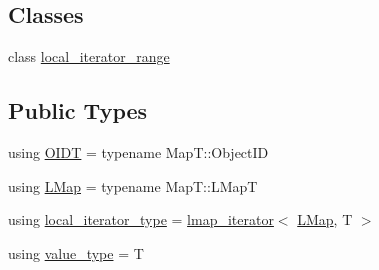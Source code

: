 \subsection*{Classes}
\begin{DoxyCompactItemize}
\item 
class \hyperlink{classshad_1_1map__iterator_1_1local__iterator__range}{local\-\_\-iterator\-\_\-range}
\end{DoxyCompactItemize}
\subsection*{Public Types}
\begin{DoxyCompactItemize}
\item 
using \hyperlink{classshad_1_1map__iterator_aecdaced930b9dcb48d5eff9ef992fbd5}{O\-I\-D\-T} = typename Map\-T\-::\-Object\-I\-D
\item 
using \hyperlink{classshad_1_1map__iterator_a157d8b69a2befd7e61c0df9eb52b2a71}{L\-Map} = typename Map\-T\-::\-L\-Map\-T
\item 
using \hyperlink{classshad_1_1map__iterator_adceb72a3948aa860edd3a4c9ceca821d}{local\-\_\-iterator\-\_\-type} = \hyperlink{classshad_1_1lmap__iterator}{lmap\-\_\-iterator}$<$ \hyperlink{classshad_1_1map__iterator_a157d8b69a2befd7e61c0df9eb52b2a71}{L\-Map}, T $>$
\item 
using \hyperlink{classshad_1_1map__iterator_a52d94a1de8e6027b63d1a72daf0ff3d0}{value\-\_\-type} = T
\end{DoxyCompactItemize}
